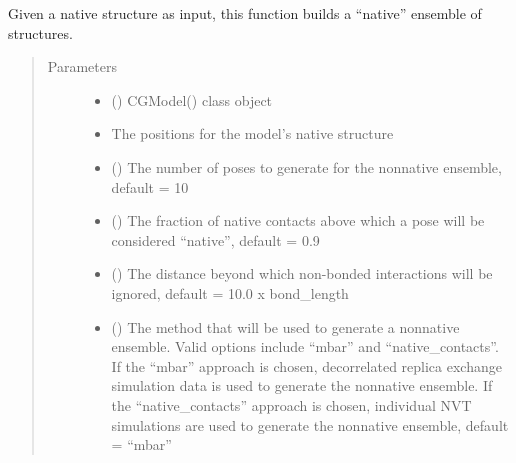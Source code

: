 \documentclass[letterpaper,12pt,english,openany,oneside]{sphinxmanual}
\begin{document}

\begin{fulllineitems}
\label{\detokenize{ensembles:ensembles.ens_build.get_native_ensemble}}
Given a native structure as input, this function builds a “native” ensemble of structures.
\begin{quote}\begin{description}
\item[{Parameters}] \leavevmode\begin{itemize}
\item {} 
 () \textendash{} CGModel() class object

\item {} 
 \textendash{} The positions for the model’s native structure

\item {} 
 () \textendash{} The number of poses to generate for the nonnative ensemble, default = 10

\item {} 
 () \textendash{} The fraction of native contacts above which a pose will be considered “native”, default = 0.9

\item {} 
 () \textendash{} The distance beyond which non-bonded interactions will be ignored, default = 10.0 x bond\_length

\item {} 
 () \textendash{} The method that will be used to generate a nonnative ensemble.  Valid options include “mbar” and “native\_contacts”.  If the “mbar” approach is chosen, decorrelated replica exchange simulation data is used to generate the nonnative ensemble.  If the “native\_contacts” approach is chosen, individual NVT simulations are used to generate the nonnative ensemble, default = “mbar”


\end{itemize}
\end{description}
\end{quote}
\end{fulllineitems}
\end{document}
